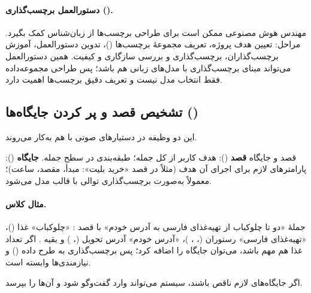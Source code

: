 \paragraph{دستورالعمل برچسب‌گذاری ().} مهندس هوش مصنوعی ممکن است برای طراحی برچسب‌ها از زبان‌شناس کمک بگیرد. مراحل: تعیین هدف پروژه، تعریف مجموعهٔ برچسب‌ها ()، تدوین دستورالعمل، آموزش برچسب‌گذاران، برچسب‌گذاری و بررسی سازگاری و کیفیت. همین دستورالعمل می‌تواند مبنای  برچسب‌گذاری با مدل‌های زبانی هم باشد؛ پس طراحی مجموعه‌داده فقط انتخاب مدل نیست و تعریف دقیق برچسب‌ها اهمیت دارد.

\subsection{تشخیص قصد و پر کردن جایگاه‌ها ()}
این دو وظیفه در دستیارهای صوتی با هم به‌کار می‌روند.

\begin{definitionbox}{قصد و جایگاه}
\textbf{قصد} (): هدف کاربر از کل جمله؛ طبقه‌بندی در سطح جمله. \textbf{جایگاه} (): پارامترهای لازم برای اجرای آن هدف (مثلاً در قصد «خرید بلیت»: مبدأ، مقصد، ساعت)؛ معمولاً به‌صورت برچسب‌گذاری توالی با قالب  مدل می‌شود.
\end{definitionbox}

\paragraph{مثال کلاس.} جملهٔ «دو تا چلوکباب از تهیه‌غذای فارسی به آدرس خودم» با قصد : «چلوکباب» غذا ()، «تهیه‌غذای فارسی» رستوران (، ، )، «آدرس خودم» آدرس تحویل (، ) و بقیه . اگر تعداد غذا هم مهم باشد، می‌توان جایگاه  را اضافه کرد؛ پس برچسب‌گذاری به طرح داده () و نیازمندی‌ها وابسته است.

اگر جایگاه‌های لازم ناقص باشند، سیستم می‌تواند وارد گفت‌وگو شود و آن‌ها را بپرسد.

